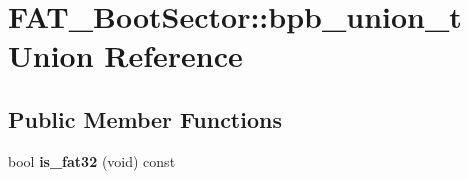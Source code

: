 \hypertarget{unionFAT__BootSector_1_1bpb__union__t}{\section{F\-A\-T\-\_\-\-Boot\-Sector\-:\-:bpb\-\_\-union\-\_\-t Union Reference}
\label{unionFAT__BootSector_1_1bpb__union__t}
}
\subsection*{Public Member Functions}
\begin{DoxyCompactItemize}
\item 
\hypertarget{unionFAT__BootSector_1_1bpb__union__t_aacc5469585aaa7d3c2f13d90510a7968}{bool {\bfseries is\-\_\-fat32} (void) const }\label{unionFAT__BootSector_1_1bpb__union__t_aacc5469585aaa7d3c2f13d90510a7968}

\end{DoxyCompactItemize}
